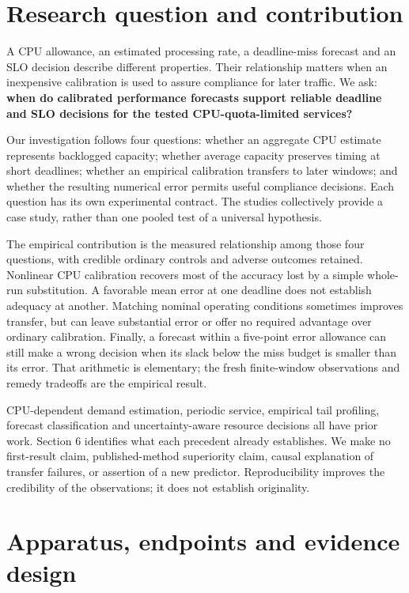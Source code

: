 \documentclass[10pt,a4paper]{article}
\begin{document}
\section{Research question and contribution}

A CPU allowance, an estimated processing rate, a deadline-miss forecast and an SLO decision describe different properties. Their relationship matters when an inexpensive calibration is used to assure compliance for later traffic. We ask: \textbf{when do calibrated performance forecasts support reliable deadline and SLO decisions for the tested CPU-quota-limited services?}

Our investigation follows four questions: whether an aggregate CPU estimate represents backlogged capacity; whether average capacity preserves timing at short deadlines; whether an empirical calibration transfers to later windows; and whether the resulting numerical error permits useful compliance decisions. Each question has its own experimental contract. The studies collectively provide a case study, rather than one pooled test of a universal hypothesis.

The empirical contribution is the measured relationship among those four questions, with credible ordinary controls and adverse outcomes retained. Nonlinear CPU calibration recovers most of the accuracy lost by a simple whole-run substitution. A favorable mean error at one deadline does not establish adequacy at another. Matching nominal operating conditions sometimes improves transfer, but can leave substantial error or offer no required advantage over ordinary calibration. Finally, a forecast within a five-point error allowance can still make a wrong decision when its slack below the miss budget is smaller than its error. That arithmetic is elementary; the fresh finite-window observations and remedy tradeoffs are the empirical result.

CPU-dependent demand estimation, periodic service, empirical tail profiling, forecast classification and uncertainty-aware resource decisions all have prior work. Section 6 identifies what each precedent already establishes. We make no first-result claim, published-method superiority claim, causal explanation of transfer failures, or assertion of a new predictor. Reproducibility improves the credibility of the observations; it does not establish originality.

\section{Apparatus, endpoints and evidence design}
\end{document}
